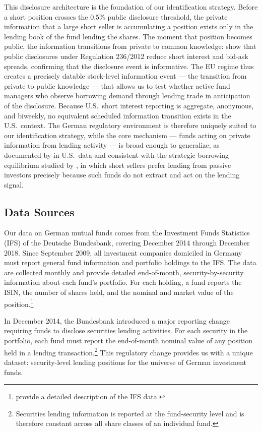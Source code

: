 This disclosure architecture is the foundation of our identification strategy. Before a short position crosses the 0.5\% public disclosure threshold, the private information that a large short seller is accumulating a position exists only in the lending book of the fund lending the shares. The moment that position becomes public, the information transitions from private to common knowledge: \citet{jones_reed_waller:16} show that public disclosures under Regulation 236/2012 reduce short interest and bid-ask spreads, confirming that the disclosure event is informative. The EU regime thus creates a precisely datable stock-level information event --- the transition from private to public knowledge --- that allows us to test whether active fund managers who observe borrowing demand through lending trade in anticipation of the disclosure. Because U.S.\ short interest reporting is aggregate, anonymous, and biweekly, no equivalent scheduled information transition exists in the U.S.\ context. The German regulatory environment is therefore uniquely suited to our identification strategy, while the core mechanism --- funds acting on private information from lending activity --- is broad enough to generalize, as documented by \citet{Honkanen2025} in U.S.\ data and consistent with the strategic borrowing equilibrium studied by \citet{PaliaSokolinski2024}, in which short sellers prefer lending from passive investors precisely because such funds do not extract and act on the lending signal.

\subsection{Data Sources}

Our data on German mutual funds comes from the Investment Funds Statistics (IFS) of the Deutsche Bundesbank, covering December 2014 through December 2018. Since September 2009, all investment companies domiciled in Germany must report general fund information and portfolio holdings to the IFS. The data are collected monthly and provide detailed end-of-month, security-by-security information about each fund's portfolio. For each holding, a fund reports the ISIN, the number of shares held, and the nominal and market value of the position.\footnote{\citet{doetsch_flory_schoenberg:2018} provide a detailed description of the IFS data.}

In December 2014, the Bundesbank introduced a major reporting change requiring funds to disclose securities lending activities. For each security in the portfolio, each fund must report the end-of-month nominal value of any position held in a lending transaction.\footnote{Securities lending information is reported at the fund-security level and is therefore constant across all share classes of an individual fund.} This regulatory change provides us with a unique dataset: security-level lending positions for the universe of German investment funds.

